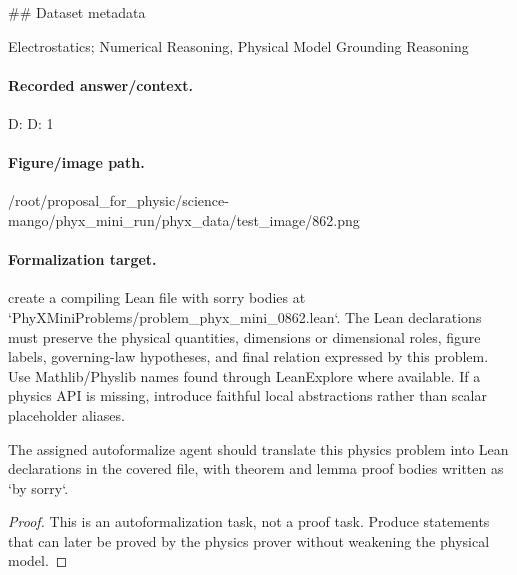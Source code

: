 \#\# Dataset metadata

Electrostatics; Numerical Reasoning, Physical Model Grounding Reasoning

\paragraph{Recorded answer/context.}
D: D: 1

\paragraph{Figure/image path.}
/root/proposal\_for\_physic/science-mango/phyx\_mini\_run/phyx\_data/test\_image/862.png

\paragraph{Formalization target.}
create a compiling Lean file with sorry bodies at `PhyXMiniProblems/problem\_phyx\_mini\_0862.lean`. The Lean declarations must preserve the physical quantities, dimensions or dimensional roles, figure labels, governing-law hypotheses, and final relation expressed by this problem.
Use Mathlib/Physlib names found through LeanExplore where available. If a physics API is missing, introduce faithful local abstractions rather than scalar placeholder aliases.

\begin{theorem}
\label{thm:physics:phyx_mini_0862:target}
The assigned autoformalize agent should translate this physics problem into Lean declarations in the covered file, with theorem and lemma proof bodies written as `by sorry`.
\end{theorem}
\begin{proof}
This is an autoformalization task, not a proof task. Produce statements that can later be proved by the physics prover without weakening the physical model.
\end{proof}

